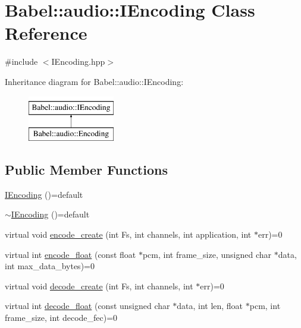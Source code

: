 \hypertarget{classBabel_1_1audio_1_1IEncoding}{}\section{Babel\+:\+:audio\+:\+:I\+Encoding Class Reference}
\label{classBabel_1_1audio_1_1IEncoding}


{\ttfamily \#include $<$I\+Encoding.\+hpp$>$}

Inheritance diagram for Babel\+:\+:audio\+:\+:I\+Encoding\+:\begin{figure}[H]
\begin{center}
\leavevmode
\includegraphics[height=2.000000cm]{classBabel_1_1audio_1_1IEncoding}
\end{center}
\end{figure}
\subsection*{Public Member Functions}
\begin{DoxyCompactItemize}
\item 
\hyperlink{classBabel_1_1audio_1_1IEncoding_a6308bc51c9df0971b3c0556589acd338}{I\+Encoding} ()=default
\item 
\hyperlink{classBabel_1_1audio_1_1IEncoding_abcf61b9e5742657e77ef61ed424b98af}{$\sim$\+I\+Encoding} ()=default
\item 
virtual void \hyperlink{classBabel_1_1audio_1_1IEncoding_a2338b60bd05e7c93f3c03963558071e2}{encode\+\_\+create} (int Fs, int channels, int application, int $\ast$err)=0
\item 
virtual int \hyperlink{classBabel_1_1audio_1_1IEncoding_a2b2767758f55d5b0c541ca3a28375eaf}{encode\+\_\+float} (const float $\ast$pcm, int frame\+\_\+size, unsigned char $\ast$data, int max\+\_\+data\+\_\+bytes)=0
\item 
virtual void \hyperlink{classBabel_1_1audio_1_1IEncoding_ac8c381697f95891a198e6426b573d8c9}{decode\+\_\+create} (int Fs, int channels, int $\ast$err)=0
\item 
virtual int \hyperlink{classBabel_1_1audio_1_1IEncoding_a3624d08fb33522dde6118f32ce84d2ed}{decode\+\_\+float} (const unsigned char $\ast$data, int len, float $\ast$pcm, int frame\+\_\+size, int decode\+\_\+fec)=0
\end{DoxyCompactItemize}


